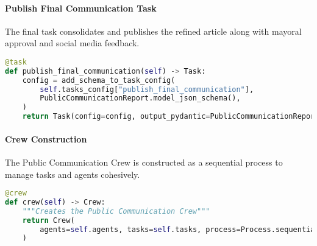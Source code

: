 \paragraph{Publish Final Communication Task}
The final task consolidates and publishes the refined article along with mayoral approval and social media feedback.

\begin{lstlisting}[language=Python]
@task
def publish_final_communication(self) -> Task:
    config = add_schema_to_task_config(
        self.tasks_config["publish_final_communication"],
        PublicCommunicationReport.model_json_schema(),
    )
    return Task(config=config, output_pydantic=PublicCommunicationReport)
\end{lstlisting}

\paragraph{Crew Construction}
The Public Communication Crew is constructed as a sequential process to manage tasks and agents cohesively.

\begin{lstlisting}[language=Python]
@crew
def crew(self) -> Crew:
    """Creates the Public Communication Crew"""
    return Crew(
        agents=self.agents, tasks=self.tasks, process=Process.sequential, verbose=True
    )
\end{lstlisting}
